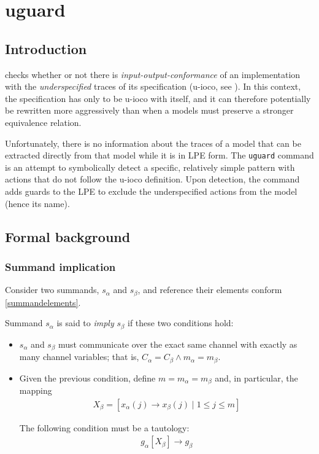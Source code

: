 \chapter{uguard}

\section{Introduction}

\txs{} checks whether or not there is \emph{input-output-conformance} of an implementation with the \emph{underspecified} traces of its specification (u-ioco, see \cite{volpato2013towards}).
In this context, the specification has only to be u-ioco with itself, and it can therefore potentially be rewritten more aggressively than when a models must preserve a stronger equivalence relation.

Unfortunately, there is no information about the traces of a model that can be extracted directly from that model while it is in LPE form.
The \texttt{uguard} command is an attempt to symbolically detect a specific, relatively simple pattern with actions that do not follow the u-ioco definition.
Upon detection, the command adds guards to the LPE to exclude the underspecified actions from the model (hence its name).

\section{Formal background}

\subsection{Summand implication}

Consider two summands, $s_\alpha$ and $s_\beta$, and reference their elements conform \ref{summandelements}.

Summand $s_\alpha$ is said to \emph{imply} $s_\beta$ if these two conditions hold:

\begin{itemize}
\item $s_\alpha$ and $s_\beta$ must communicate over the exact same channel with exactly as many channel variables; that is, $C_\alpha = C_\beta \land m_\alpha = m_\beta$.

\item Given the previous condition, define $m = m_\alpha = m_\beta$ and, in particular, the mapping
\begin{align*}
X_\beta = [x_\alpha(j) \rightarrow x_\beta(j) \;|\; 1 \leq j \leq m]
\end{align*}

The following condition must be a tautology:
\begin{align*}
g_\alpha[X_\beta] \rightarrow g_\beta
\end{align*}
\end{itemize}

